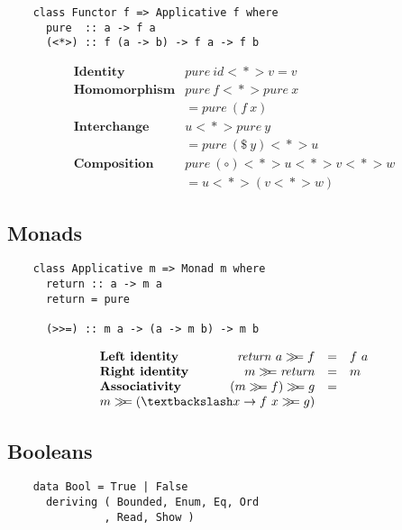 \begin{multicols}{2}
	\begin{verbatim}
	class Functor f => Applicative f where 
	  pure  :: a -> f a
	  (<*>) :: f (a -> b) -> f a -> f b
	\end{verbatim}
	\begin{displaymath}
	\begin{array}{lr}
	\textbf{Identity} & \mathit{pure}~\mathit{id} <\!\!*\!\!> v = v \\ 
	\textbf{Homomorphism} & \mathit{pure}~f <\!\!*\!\!> \mathit{pure}~x \\& = \mathit{pure}~(f~x) \\
	\textbf{Interchange} & u <\!\!*\!\!> \mathit{pure}~y \\
	& = \mathit{pure}~(\$~y) <\!\!*\!\!> u \\
	\textbf{Composition} & \mathit{pure}~(\circ) <\!\!*\!\!> u <\!\!*\!\!> v <\!\!*\!\!> w  \\
	& = u <\!\!*\!\!> (v <\!\!*\!\!> w)
	\end{array}
	\end{displaymath}
	
	\subsection*{Monads}
	
	\begin{verbatim}
	class Applicative m => Monad m where 
	  return :: a -> m a
	  return = pure
	
	  (>>=) :: m a -> (a -> m b) -> m b
	\end{verbatim}
	
	\begin{displaymath}
	\begin{array}{lrcl}
	\textbf{Left identity} & \mathit{return}~a \bind f & = & f~a \\
	\textbf{Right identity} & m \bind \mathit{return} & = & m \\
	\textbf{Associativity} & (m \bind f) \bind g & = & \\ \multicolumn{2}{r}{ m \bind (\textbackslash x \to f~x \bind g)}
	\end{array}
	\end{displaymath}
	
	\subsection*{Booleans}
	
	\begin{verbatim}
	data Bool = True | False
	  deriving ( Bounded, Enum, Eq, Ord
	           , Read, Show )
	\end{verbatim}
	

\end{multicols}
